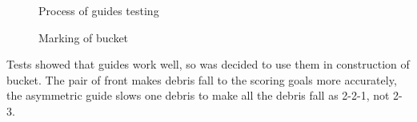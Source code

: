 \begin{enumerate}
\begin{figure}[H]
\begin{minipage}[h]{0.31\linewidth}
  		\caption{Process of guides testing}
  	\end{minipage}
  	\hfill
  	\begin{minipage}[h]{0.31\linewidth}
  		\caption{Marking of bucket}
  	\end{minipage}
  \end{figure}
  Tests showed that guides work well, so was decided to use them in construction of bucket. The pair of front makes debris fall to the scoring goals more accurately, the asymmetric guide slows one debris to make all the debris fall as 2-2-1, not 2-3.
 

\end{enumerate}
